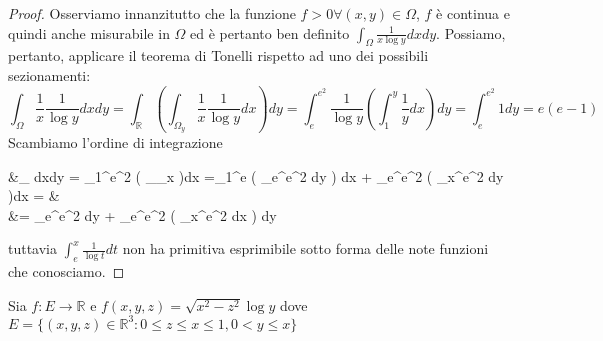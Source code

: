\begin{proof}
	Osserviamo innanzitutto che la funzione $f > 0 \forall (x, y) \in \Omega$, $f$ è continua e quindi anche misurabile in $\Omega$ ed è pertanto ben definito $\int_\Omega \frac{1}{x\log{y}}dxdy$. Possiamo, pertanto, applicare il teorema di Tonelli rispetto ad uno dei possibili sezionamenti:
	$$
	\int_\Omega \frac{1}{x} \frac{1}{\log{y}}dxdy = \int_\mathbb{R} \left( \int_{\Omega_y} \frac{1}{x}\frac{1}{\log{y}} dx \right)dy = \int_e^{e^2} \frac{1}{\log{y}} \left( \int_1^y \frac{1}{y} dx \right) dy = \int_e^{e^2} 1dy = e(e-1)
	$$
	Scambiamo l'ordine di integrazione
	\begin{flalign*}
	&\int_\Omega {} dxdy = \int_1^{e^2}  \left( \int_{\Omega_x}  \right)dx =\int_1^e  \left( \int_e^{e^2} dy \right) dx + \int_e^{e^2}  \left( \int_x^{e^2} dy \right)dx = & \\
	&= \int_e^{e^2} dy + \int_e^{e^2} \left( \int_x^{e^2} dx \right) dy
	\end{flalign*}
	tuttavia $\int_e^x \frac{1}{\log{t}}dt$ non ha primitiva esprimibile sotto forma delle note funzioni che conosciamo. 
\end{proof}
\begin{exercise}
	Sia $f: E \to \mathbb{R}$ e $f(x, y, z) = \sqrt{x^2 - z^2}\log{y}$ dove $E = \{(x, y, z) \in \mathbb{R}^3 : 0 \leq z \leq x \leq 1, 0 < y \leq x \}$
\end{exercise}
